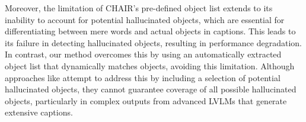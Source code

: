 \begin{table}[t]
\small
\centering
{}
\vspace{-2mm}
\caption{Comparison of LLM-augmented CHAIR with original CHAIR metric. Here, F. and C. denote faithfulness and coverage scores in percentage (\%). Acc (F) represents the average percentage of hallucinated objects detected by the metric. Acc (C) denotes the average percentage of objects detected by metric.}
\vspace{-5mm}
\label{tab:LLM agent framework ablate}
\end{table}

Moreover, the limitation of CHAIR's pre-defined object list extends to its inability to account for potential hallucinated objects, which are essential for differentiating between mere words and actual objects in captions. This leads to its failure in detecting hallucinated objects, resulting in performance degradation. In contrast, our method overcomes this by using an automatically extracted object list that dynamically matches objects, avoiding this limitation. Although approaches like \citet{wang2023llm} attempt to address this by including a selection of potential hallucinated objects, they cannot guarantee coverage of all possible hallucinated objects, particularly in complex outputs from advanced LVLMs that generate extensive captions.

